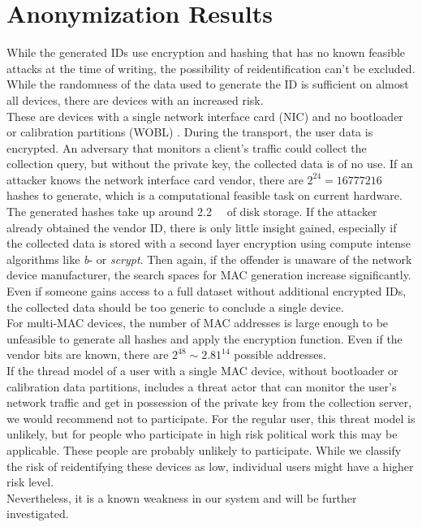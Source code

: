 \section{Anonymization Results}
\label{sec:results:anon}
    While the generated IDs use encryption and hashing that has no known feasible attacks at the time of writing, the possibility of reidentification can't be excluded. While the randomness of the data used to generate the ID is sufficient on almost all devices, there are devices with an increased risk.\\
    These are devices with a single network interface card (NIC) and no bootloader or calibration partitions (WOBL) . During the transport, the user data is encrypted. An adversary that monitors a client's traffic could collect the collection query, but without the private key, the collected data is of no use. If an attacker knows the network interface card vendor, there are $2^{24} = 16777216$ hashes to generate, which is a computational feasible task on current hardware. The generated hashes take up around \SIlist{2.2}{\giga\byte} of disk storage.
    If the attacker already obtained the vendor ID, there is only little insight gained, especially if the collected data is stored with a second layer encryption using compute intense algorithms like \textit{b}- or \textit{scrypt}. 
    Then again, if the offender is unaware of the network device manufacturer, the search spaces for MAC generation increase significantly. Even if someone gains access to a full dataset without additional encrypted IDs, the collected data should be too generic to conclude a single device.\\
    For multi-MAC devices, the number of MAC addresses is large enough to be unfeasible to generate all hashes and apply the encryption function. Even if the vendor bits are known, there are $2^{48} \sim 2.81^{14}$ possible addresses.\\
    If the thread model of a user with a single MAC device, without bootloader or calibration data partitions, includes a threat actor that can monitor the user's network traffic and get in possession of the private key from the collection server, we would recommend not to participate. For the regular user, this threat model is unlikely, but for people who participate in high risk political work this may be applicable. These people are probably unlikely to participate. While we classify the risk of reidentifying these devices as low, individual users might have a higher risk level.\\
    Nevertheless, it is a known weakness in our system and will be further investigated.\\
    
